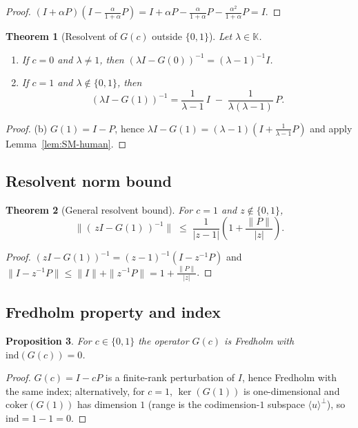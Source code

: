 \documentclass[11pt]{article}
\newtheorem{theorem}{Theorem}[section]
\newtheorem{proposition}[theorem]{Proposition}
\theoremstyle{definition}
\newcommand{\K}{\mathbb{K}}
\DeclareMathOperator{\kerop}{ker}
\begin{document}
\begin{proof}
$(I+\alpha P)\left(I-\frac{\alpha}{1+\alpha}P\right)
= I + \alpha P - \frac{\alpha}{1+\alpha}P - \frac{\alpha^2}{1+\alpha}P
= I.$
\end{proof}

\begin{theorem}[Resolvent of $G(c)$ outside $\{0,1\}$]\label{thm:resolvent-human}
Let $\lambda\in\K$.
\begin{enumerate}
\item If $c=0$ and $\lambda\neq 1$, then $(\lambda I - G(0))^{-1}=(\lambda-1)^{-1} I$.
\item If $c=1$ and $\lambda\notin\{0,1\}$, then
\[
(\lambda I - G(1))^{-1}
= \frac{1}{\lambda-1}\,I \;-\; \frac{1}{\lambda(\lambda-1)}\,P.
\]
\end{enumerate}
\end{theorem}

\begin{proof}
(b) $G(1)=I-P$, hence $\lambda I - G(1)=(\lambda-1)\left(I+\frac{1}{\lambda-1}P\right)$ and apply Lemma~\ref{lem:SM-human}.
\end{proof}

\subsection{Resolvent norm bound}

\begin{theorem}[General resolvent bound]\label{thm:bound-human}
For $c=1$ and $z\notin\{0,1\}$,
\[
\big\|(\,zI - G(1)\,)^{-1}\big\| \;\le\; \frac{1}{|z-1|}\left(1 + \frac{\|P\|}{|z|}\right).
\]
\end{theorem}

\begin{proof}
$(zI - G(1))^{-1}=(z-1)^{-1}\left(I - z^{-1}P\right)$ and $\|I - z^{-1}P\|\le \|I\| + \|z^{-1}P\|=1+\frac{\|P\|}{|z|}$.
\end{proof}

\subsection{Fredholm property and index}

\begin{proposition}\label{prop:fredholm}
For $c\in\{0,1\}$ the operator $G(c)$ is Fredholm with $\mathrm{ind}(G(c))=0$.
\end{proposition}

\begin{proof}
$G(c)=I-cP$ is a finite-rank perturbation of $I$, hence Fredholm with the same index; alternatively, for $c=1$, $\kerop(G(1))$ is one-dimensional and $\mathrm{coker}(G(1))$ has dimension $1$ (range is the codimension-$1$ subspace $\langle u\rangle^\perp$), so $\mathrm{ind}=1-1=0$.
\end{proof}
\end{document}
